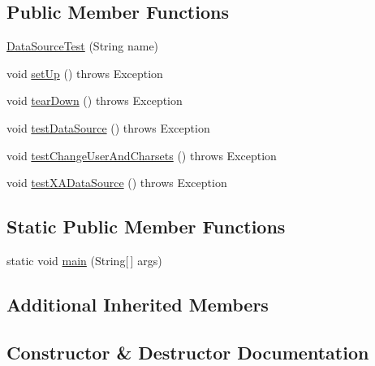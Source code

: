 \subsection*{Public Member Functions}
\begin{DoxyCompactItemize}
\item 
\mbox{\hyperlink{classtestsuite_1_1simple_1_1_data_source_test_ad5806ab14f44ef48ea33738cd8bcff30}{Data\+Source\+Test}} (String name)
\item 
void \mbox{\hyperlink{classtestsuite_1_1simple_1_1_data_source_test_af972007f4b839815702c12a48fc1b77d}{set\+Up}} ()  throws Exception 
\item 
void \mbox{\hyperlink{classtestsuite_1_1simple_1_1_data_source_test_abed70f64e5fb149eef73ed2e7ccf3d59}{tear\+Down}} ()  throws Exception 
\item 
void \mbox{\hyperlink{classtestsuite_1_1simple_1_1_data_source_test_aceabb67c36b42514892dc1a6a38eae1f}{test\+Data\+Source}} ()  throws Exception 
\item 
void \mbox{\hyperlink{classtestsuite_1_1simple_1_1_data_source_test_a238136c42e16d78196d3a6104c43cce5}{test\+Change\+User\+And\+Charsets}} ()  throws Exception 
\item 
void \mbox{\hyperlink{classtestsuite_1_1simple_1_1_data_source_test_aeffb3e326e27d83bfc0da82269ef479b}{test\+X\+A\+Data\+Source}} ()  throws Exception 
\end{DoxyCompactItemize}
\subsection*{Static Public Member Functions}
\begin{DoxyCompactItemize}
\item 
static void \mbox{\hyperlink{classtestsuite_1_1simple_1_1_data_source_test_a0cca4d619b5b552e16eb9332c191ce5f}{main}} (String\mbox{[}$\,$\mbox{]} args)
\end{DoxyCompactItemize}
\subsection*{Additional Inherited Members}


\subsection{Constructor \& Destructor Documentation}
\mbox{\label{classtestsuite_1_1simple_1_1_data_source_test_ad5806ab14f44ef48ea33738cd8bcff30}} 
